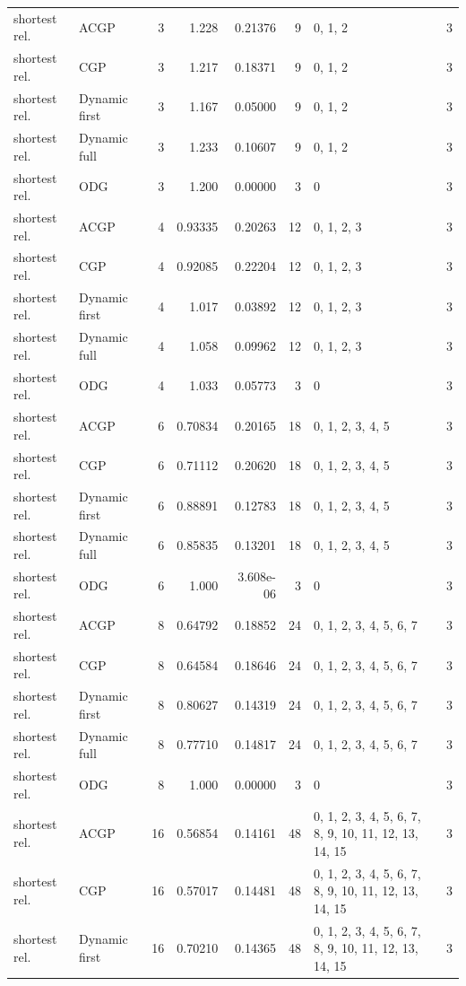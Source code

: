 \documentclass[10pt,a4paper]{article}
\begin{document}
\begin{longtable}{@{}p{23mm}p{29mm}rrrrp{36mm}r@{}}
shortest rel. & ACGP & 3 & 1.228 & 0.21376 & 9 & 0, 1, 2 & 3 \\
shortest rel. & CGP & 3 & 1.217 & 0.18371 & 9 & 0, 1, 2 & 3 \\
shortest rel. & Dynamic first & 3 & 1.167 & 0.05000 & 9 & 0, 1, 2 & 3 \\
shortest rel. & Dynamic full & 3 & 1.233 & 0.10607 & 9 & 0, 1, 2 & 3 \\
shortest rel. & ODG & 3 & 1.200 & 0.00000 & 3 & 0 & 3 \\
shortest rel. & ACGP & 4 & 0.93335 & 0.20263 & 12 & 0, 1, 2, 3 & 3 \\
shortest rel. & CGP & 4 & 0.92085 & 0.22204 & 12 & 0, 1, 2, 3 & 3 \\
shortest rel. & Dynamic first & 4 & 1.017 & 0.03892 & 12 & 0, 1, 2, 3 & 3 \\
shortest rel. & Dynamic full & 4 & 1.058 & 0.09962 & 12 & 0, 1, 2, 3 & 3 \\
shortest rel. & ODG & 4 & 1.033 & 0.05773 & 3 & 0 & 3 \\
shortest rel. & ACGP & 6 & 0.70834 & 0.20165 & 18 & 0, 1, 2, 3, 4, 5 & 3 \\
shortest rel. & CGP & 6 & 0.71112 & 0.20620 & 18 & 0, 1, 2, 3, 4, 5 & 3 \\
shortest rel. & Dynamic first & 6 & 0.88891 & 0.12783 & 18 & 0, 1, 2, 3, 4, 5 & 3 \\
shortest rel. & Dynamic full & 6 & 0.85835 & 0.13201 & 18 & 0, 1, 2, 3, 4, 5 & 3 \\
shortest rel. & ODG & 6 & 1.000 & 3.608e-06 & 3 & 0 & 3 \\
shortest rel. & ACGP & 8 & 0.64792 & 0.18852 & 24 & 0, 1, 2, 3, 4, 5, 6, 7 & 3 \\
shortest rel. & CGP & 8 & 0.64584 & 0.18646 & 24 & 0, 1, 2, 3, 4, 5, 6, 7 & 3 \\
shortest rel. & Dynamic first & 8 & 0.80627 & 0.14319 & 24 & 0, 1, 2, 3, 4, 5, 6, 7 & 3 \\
shortest rel. & Dynamic full & 8 & 0.77710 & 0.14817 & 24 & 0, 1, 2, 3, 4, 5, 6, 7 & 3 \\
shortest rel. & ODG & 8 & 1.000 & 0.00000 & 3 & 0 & 3 \\
shortest rel. & ACGP & 16 & 0.56854 & 0.14161 & 48 & 0, 1, 2, 3, 4, 5, 6, 7, 8, 9, 10, 11, 12, 13, 14, 15 & 3 \\
shortest rel. & CGP & 16 & 0.57017 & 0.14481 & 48 & 0, 1, 2, 3, 4, 5, 6, 7, 8, 9, 10, 11, 12, 13, 14, 15 & 3 \\
shortest rel. & Dynamic first & 16 & 0.70210 & 0.14365 & 48 & 0, 1, 2, 3, 4, 5, 6, 7, 8, 9, 10, 11, 12, 13, 14, 15 & 3 \\

\end{longtable}
\end{document}
